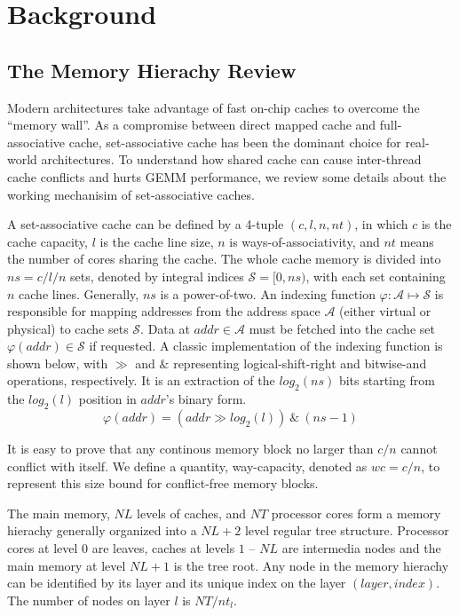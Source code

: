 \section{Background}\label{sec:background}

\subsection{The Memory Hierachy Review}\label{subsec:hierachy}

Modern architectures take advantage of fast on-chip caches
to overcome the ``memory wall''.
As a compromise between direct mapped cache and full-associative cache,
set-associative cache has been the dominant choice for real-world architectures.
To understand how shared cache can cause inter-thread cache conflicts
and hurts GEMM performance, we review some details
about the working mechanisim of set-associative caches.

A set-associative cache can be defined by a 4-tuple $(c, l, n, nt)$,
in which $c$ is the cache capacity, $l$ is the cache line size,
$n$ is ways-of-associativity,
and $nt$ means the number of cores sharing the cache.
The whole cache memory is divided into $ns=c/l/n$ sets,
denoted by integral indices $\mathcal{S} = [0, ns)$,
with each set containing $n$ cache lines.
Generally, $ns$ is a power-of-two.
An indexing function $\varphi: \mathcal{A} \mapsto \mathcal{S}$ is responsible for
mapping addresses from the address space $\mathcal{A}$
(either virtual or physical) to cache sets $\mathcal{S}$.
Data at $addr \in \mathcal{A}$ must be fetched
into the cache set $\varphi(addr) \in \mathcal{S}$ if requested.
A classic implementation of the indexing function is shown below,
with $\gg$ and $\&$ representing logical-shift-right and bitwise-and operations, respectively.
It is an extraction of the $log_2(ns)$ bits starting from the $log_2(l)$
position in $addr$'s binary form.
\begin{equation*}
  \varphi(addr) = (addr \gg log_2(l)) ~\&~ (ns-1)
  \label{eq:phi}
\end{equation*}

It is easy to prove that any continous memory block no larger than $c/n$
cannot conflict with itself.
We define a quantity, way-capacity, denoted as $wc=c/n$,
to represent this size bound for conflict-free memory blocks.

The main memory, $NL$ levels of caches, and $NT$ processor cores
form a memory hierachy generally organized into
a $NL+2$ level regular tree structure.
Processor cores at level $0$ are leaves,
caches at levels $1$ -- $NL$ are intermedia nodes
and the main memory at level $NL+1$ is the tree root.
Any node in the memory hierachy can be identified by
its layer and its unique index on the layer $(layer, index)$.
The number of nodes on layer $l$ is $NT / nt_l$.

